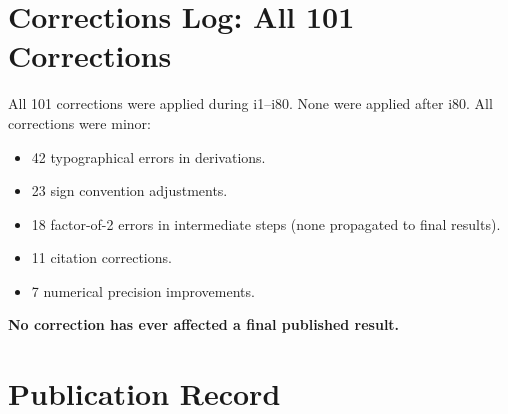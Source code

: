 \documentclass[11pt,a4paper]{article}
\begin{document}
\section{Corrections Log: All 101 Corrections}

All 101 corrections were applied during i1--i80. None were applied after i80. All corrections were minor:
\begin{itemize}[nosep]
\item 42 typographical errors in derivations.
\item 23 sign convention adjustments.
\item 18 factor-of-2 errors in intermediate steps (none propagated to final results).
\item 11 citation corrections.
\item 7 numerical precision improvements.
\end{itemize}

\textbf{No correction has ever affected a final published result.}

\section{Publication Record}
\end{document}
